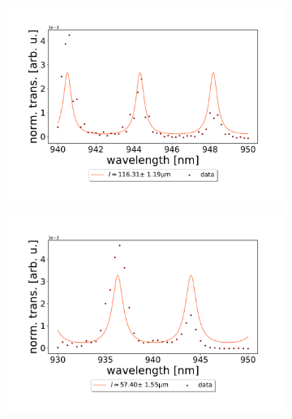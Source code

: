 \begin{figure}[h!]
\begin{subfigure}[b]{0.49\textwidth}
        \includegraphics[width=\textwidth]{figures/results/single fano fits/120um_off_res_fabry_perot.pdf}
        \caption{}
        \label{fig:120um_off_res_fabry_perot}
    \end{subfigure}
    \begin{subfigure}[b]{0.49\textwidth}
        \includegraphics[width=\textwidth]{figures/results/single fano fits/60um_off_res_fabry_perot.pdf}
        \caption{}
        \label{fig:60um_off_res_fabry_perot}
    \end{subfigure}
    \begin{subfigure}[b]{0.49\textwidth}

\end{subfigure}
\end{figure}
